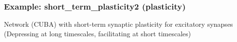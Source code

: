 \documentclass[letterpaper,10pt,english]{manual}
\begin{document}
\resetcurrentobjects
\hypertarget{--doc-examples-plasticity_short_term_plasticity2}{}

\hypertarget{index-80}{}\subsubsection{Example: short\_term\_plasticity2 (plasticity)}

Network (CUBA) with short-term synaptic plasticity for excitatory synapses
(Depressing at long timescales, facilitating at short timescales)
\end{document}
